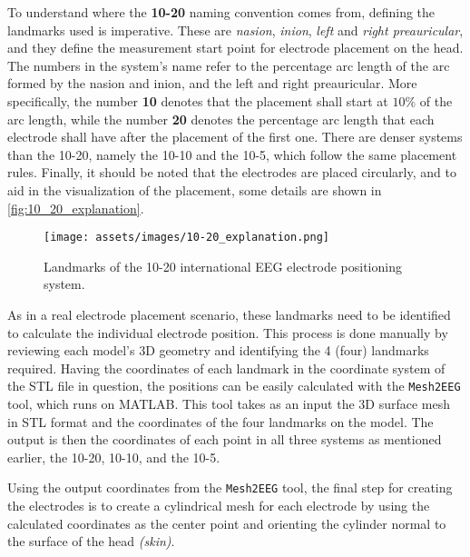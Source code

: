 To understand where the \textbf{10-20} naming convention comes from, defining the landmarks used is imperative. These are \textit{\gls{nasion}}, \textit{\gls{inion}}, \textit{left} and \textit{right \gls{preauricular}}, and they define the measurement start point for electrode placement on the head. The numbers in the system's name refer to the percentage arc length of the arc formed by the \gls{nasion} and \gls{inion}, and the left and right \gls{preauricular}. More specifically, the number \textbf{10} denotes that the placement shall start at $10\%$ of the arc length, while the number \textbf{20} denotes the percentage arc length that each electrode shall have after the placement of the first one. There are denser systems than the 10-20, namely the 10-10 and the 10-5, which follow the same placement rules. Finally, it should be noted that the electrodes are placed circularly, and to aid in the visualization of the placement, some details are shown in \autoref{fig:10_20_explanation}.

\begin{figure}[H]
    \centering
    \texttt{[image: assets/images/10-20\_explanation.png]}
    \caption[Landmarks of the 10-20 international \gls{EEG} electrode positioning system]{Landmarks of the 10-20 international \gls{EEG} electrode positioning system. \cite[figure 13.2, p.368]{Malmivuo1995}}
    \label{fig:10_20_explanation}
\end{figure}

As in a real electrode placement scenario, these landmarks need to be identified to calculate the individual electrode position. This process is done manually by reviewing each model's 3D geometry and identifying the 4 (four) landmarks required. Having the coordinates of each landmark in the coordinate system of the \gls{STL} file in question, the positions can be easily calculated with the \texttt{Mesh2EEG} \cite{Giacometti2014} tool, which runs on \gls{MATLAB}. This tool takes as an input the 3D surface mesh in \gls{STL} format and the coordinates of the four landmarks on the model. The output is then the coordinates of each point in all three systems as mentioned earlier, the 10-20, 10-10, and the 10-5.

Using the output coordinates from the \texttt{Mesh2EEG} \cite{Giacometti2014} tool, the final step for creating the electrodes is to create a cylindrical mesh for each electrode by using the calculated coordinates as the center point and orienting the cylinder normal to the surface of the head \textit{(skin)}.

